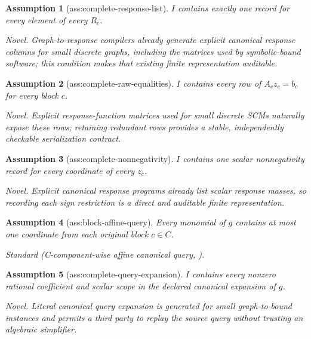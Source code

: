 \documentclass{article}
\newtheorem{assumption}{Assumption}
\begin{document}
\begin{assumption}[ass:complete-response-list]\label{ass:complete-response-list}
\(I\) contains exactly one record for every element of every \(R_c\).
\par\smallskip\noindent\emph{Novel.} Graph-to-response compilers already generate explicit canonical response columns for small discrete graphs, including the matrices used by symbolic-bound software; this condition makes that existing finite representation auditable.
\end{assumption}

\begin{assumption}[ass:complete-raw-equalities]\label{ass:complete-raw-equalities}
\(I\) contains every row of \(A_cz_c=b_c\) for every block \(c\).
\par\smallskip\noindent\emph{Novel.} Explicit response-function matrices used for small discrete SCMs naturally expose these rows; retaining redundant rows provides a stable, independently checkable serialization contract.
\end{assumption}

\begin{assumption}[ass:complete-nonnegativity]\label{ass:complete-nonnegativity}
\(I\) contains one scalar nonnegativity record for every coordinate of every \(z_c\).
\par\smallskip\noindent\emph{Novel.} Explicit canonical response programs already list scalar response masses, so recording each sign restriction is a direct and auditable finite representation.
\end{assumption}

\begin{assumption}[ass:block-affine-query]\label{ass:block-affine-query}
Every monomial of \(g\) contains at most one coordinate from each original block \(c\in C\).
\par\smallskip\noindent\emph{Standard} (C-component-wise affine canonical query, \cite{ShridharanIyengar2023}).
\end{assumption}

\begin{assumption}[ass:complete-query-expansion]\label{ass:complete-query-expansion}
\(I\) contains every nonzero rational coefficient and scalar scope in the declared canonical expansion of \(g\).
\par\smallskip\noindent\emph{Novel.} Literal canonical query expansion is generated for small graph-to-bound instances and permits a third party to replay the source query without trusting an algebraic simplifier.
\end{assumption}
\end{document}
